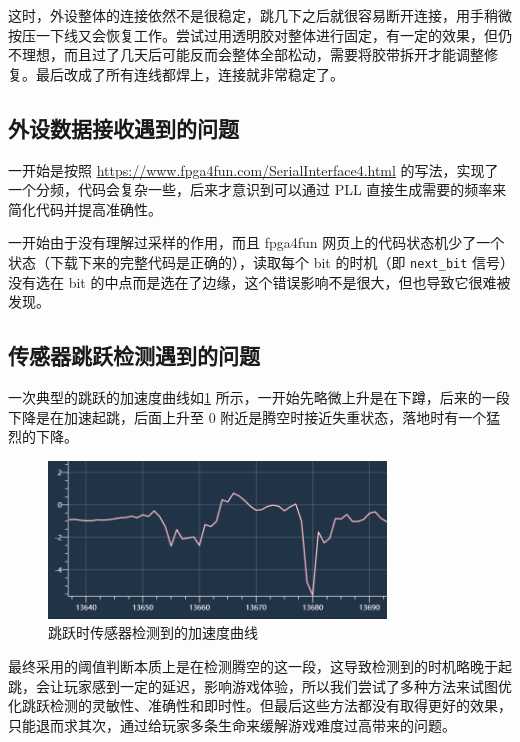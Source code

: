 \documentclass[UTF8, 11pt, fontset=none]{ctexart}
\begin{document}
这时，外设整体的连接依然不是很稳定，跳几下之后就很容易断开连接，用手稍微按压一下线又会恢复工作。尝试过用透明胶对整体进行固定，有一定的效果，但仍不理想，而且过了几天后可能反而会整体全部松动，需要将胶带拆开才能调整修复。最后改成了所有连线都焊上，连接就非常稳定了。

\subsection{外设数据接收遇到的问题}

一开始是按照 \url{https://www.fpga4fun.com/SerialInterface4.html} 的写法，实现了一个分频，代码会复杂一些，后来才意识到可以通过 PLL 直接生成需要的频率来简化代码并提高准确性。

一开始由于没有理解过采样的作用，而且 fpga4fun 网页上的代码状态机少了一个状态（下载下来的完整代码是正确的），读取每个 bit 的时机（即 \texttt{next_bit} 信号）没有选在 bit 的中点而是选在了边缘，这个错误影响不是很大，但也导致它很难被发现。

\subsection{传感器跳跃检测遇到的问题}

一次典型的跳跃的加速度曲线如\cref{sensor-jump} 所示，一开始先略微上升是在下蹲，后来的一段下降是在加速起跳，后面上升至 0 附近是腾空时接近失重状态，落地时有一个猛烈的下降。

\begin{figure}[ht]
    \centering
    \includegraphics[width=0.8\textwidth]{images/sensor-jump.png}
    \caption{跳跃时传感器检测到的加速度曲线}
    \label{sensor-jump}
\end{figure}

最终采用的阈值判断本质上是在检测腾空的这一段，这导致检测到的时机略晚于起跳，会让玩家感到一定的延迟，影响游戏体验，所以我们尝试了多种方法来试图优化跳跃检测的灵敏性、准确性和即时性。但最后这些方法都没有取得更好的效果，只能退而求其次，通过给玩家多条生命来缓解游戏难度过高带来的问题。
\end{document}
